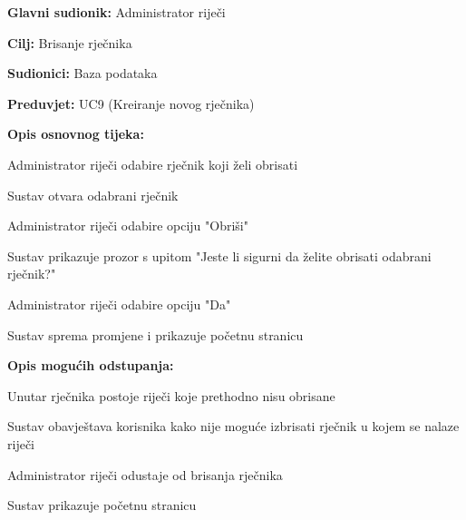 						\noindent {}
					\begin{packed_item}
						
						\item \textbf{Glavni sudionik: }Administrator riječi
						\item  \textbf{Cilj:} Brisanje rječnika
						\item  \textbf{Sudionici:} Baza podataka
						\item  \textbf{Preduvjet:} UC9 (Kreiranje novog rječnika)
						\item  \textbf{Opis osnovnog tijeka:}
						
						\item[] \begin{packed_enum}
							
							\item Administrator riječi odabire rječnik koji želi obrisati
							\item Sustav otvara odabrani rječnik
							\item Administrator riječi odabire opciju "Obriši"
							\item Sustav prikazuje prozor s upitom "Jeste li sigurni da želite obrisati odabrani rječnik?"
							\item Administrator riječi odabire opciju "Da"
							\item Sustav sprema promjene i prikazuje početnu stranicu
							
						\end{packed_enum}
						
						\item  \textbf{Opis mogućih odstupanja:}
						
						\item[] \begin{packed_item}
							
							\item[3.a] Unutar rječnika postoje riječi koje prethodno nisu obrisane
							\item[] \begin{packed_enum}
								
								\item Sustav obavještava korisnika kako nije moguće izbrisati rječnik u kojem se nalaze riječi
								
							\end{packed_enum}
							
							\item[4.a] Administrator riječi odustaje od brisanja rječnika
							\item[] \begin{packed_enum}
								
								\item Sustav prikazuje početnu stranicu
								
							\end{packed_enum}
						\end{packed_item}
					\end{packed_item}
					
